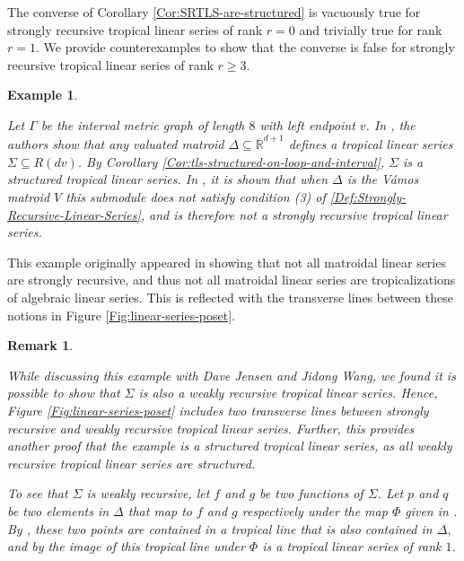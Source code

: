 \documentclass{amsart}
\newtheorem{varexample}[theorem]{Example}
\newtheorem{varremark}[theorem]{Remark}
\newenvironment{example}{\begin{varexample}
		\begin{normalfont}}{\end{normalfont}
\end{varexample}}
\newenvironment{remark}{\begin{varremark}
		\begin{normalfont}}{\end{normalfont}
\end{varremark}}
\begin{document}
	The converse of Corollary \ref{Cor:SRTLS-are-structured} is vacuously true for strongly recursive tropical linear series of rank $r = 0$ and trivially true for rank $r = 1$. We provide counterexamples to show that the converse is false for strongly recursive tropical linear series of rank $r \geq 3$.
	
	\begin{example}
		\label{Ex:vamos-matroid}
		Let $\Gamma$ be the interval metric graph of length $8$ with left endpoint $v$. In \cite[Theorem~6.3]{chang2025matroidal}, the authors show that any valuated matroid $\Delta \subseteq \overline{\mathbb{R}}^{d+1}$ defines a tropical linear series $\Sigma \subseteq R(dv)$. By Corollary \ref{Cor:tls-structured-on-loop-and-interval}, $\Sigma$ is a structured tropical linear series. In \cite[Example~6.6]{chang2025matroidal}, it is shown that when $\Delta$ is the V\'amos matroid $V$ this submodule does not satisfy condition (3) of \ref{Def:Strongly-Recursive-Linear-Series}, and is therefore not a strongly recursive tropical linear series.
	\end{example}
	
	This example originally appeared in \cite{chang2025matroidal} showing that not all matroidal linear series are strongly recursive, and thus not all matroidal linear series are tropicalizations of algebraic linear series. This is reflected with the transverse lines between these notions in Figure \ref{Fig:linear-series-poset}.
	
	\begin{remark}
		While discussing this example with Dave Jensen and Jidong Wang, we found it is possible to show that $\Sigma$ is also a weakly recursive tropical linear series. Hence, Figure \ref{Fig:linear-series-poset} includes two transverse lines between strongly recursive and weakly recursive tropical linear series. Further, this provides another proof that the example is a structured tropical linear series, as all weakly recursive tropical linear series are structured. 
		
		To see that $\Sigma$ is weakly recursive, let $f$ and $g$ be two functions of $\Sigma$. Let $p$ and $q$ be two elements in $\Delta$ that map to $f$ and $g$ respectively under the map $\Phi$ given in \cite[Theorem~6.3]{chang2025matroidal}. By \cite[Theorem~3.1.9]{wangPhDthesis}, these two points are contained in a tropical line that is also contained in $\Delta$, and by \cite[Theorem~6.3]{chang2025matroidal} the image of this tropical line under $\Phi$ is a tropical linear series of rank $1$.
	\end{remark}
	
\end{document}
